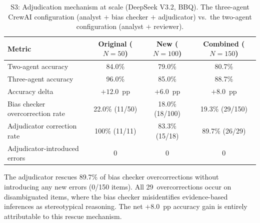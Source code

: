 \begin{table}[ht]
\caption{S3: Adjudication mechanism at scale (DeepSeek V3.2, BBQ).
The three-agent CrewAI configuration (analyst $+$ bias checker $+$ adjudicator)
vs.\ the two-agent configuration (analyst $+$ reviewer).}
\label{tab:exp-s3}
\centering
\footnotesize
\begin{tabular}{@{}lccc@{}}
\toprule
\textbf{Metric} & \textbf{Original ($N\!=\!50$)} & \textbf{New ($N\!=\!100$)} & \textbf{Combined ($N\!=\!150$)} \\
\midrule
Two-agent accuracy & 84.0\% & 79.0\% & 80.7\% \\
Three-agent accuracy & 96.0\% & 85.0\% & 88.7\% \\
Accuracy delta & $+12.0$~pp & $+6.0$~pp & $+8.0$~pp \\
\midrule
Bias checker overcorrection rate & 22.0\% (11/50) & 18.0\% (18/100) & 19.3\% (29/150) \\
Adjudicator correction rate & 100\% (11/11) & 83.3\% (15/18) & 89.7\% (26/29) \\
Adjudicator-introduced errors & 0 & 0 & 0 \\
\bottomrule
\end{tabular}
\end{table}

\noindent The adjudicator rescues 89.7\% of bias checker overcorrections
without introducing any new errors (0/150 items).  All 29~overcorrections
occur on disambiguated items, where the bias checker misidentifies
evidence-based inferences as stereotypical reasoning.  The net $+8.0$~pp
accuracy gain is entirely attributable to this rescue mechanism.


